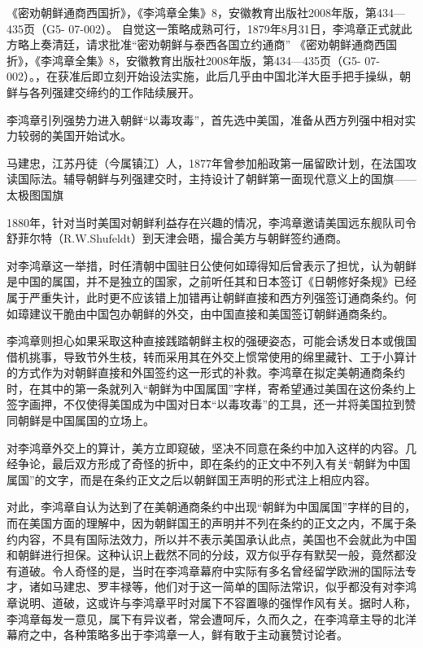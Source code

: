 \documentclass[12pt,UTF8]{ctexbook}
\begin{document}
《密劝朝鲜通商西国折》，《李鸿章全集》8，安徽教育出版社2008年版，第434—435页（G5- 07-002）。
自觉这一策略成熟可行，1879年8月31日，李鸿章正式就此方略上奏清廷，请求批准“密劝朝鲜与泰西各国立约通商” 《密劝朝鲜通商西国折》，《李鸿章全集》8，安徽教育出版社2008年版，第434—435页（G5- 07-002）。，在获准后即立刻开始设法实施，此后几乎由中国北洋大臣手把手操纵，朝鲜与各列强建交缔约的工作陆续展开。

李鸿章引列强势力进入朝鲜“以毒攻毒”，首先选中美国，准备从西方列强中相对实力较弱的美国开始试水。


马建忠，江苏丹徒（今属镇江）人，1877年曾参加船政第一届留欧计划，在法国攻读国际法。辅导朝鲜与列强建交时，主持设计了朝鲜第一面现代意义上的国旗——太极图国旗

1880年，针对当时美国对朝鲜利益存在兴趣的情况，李鸿章邀请美国远东舰队司令舒菲尔特（R.W.Shufeldt）到天津会晤，撮合美方与朝鲜签约通商。

对李鸿章这一举措，时任清朝中国驻日公使何如璋得知后曾表示了担忧，认为朝鲜是中国的属国，并不是独立的国家，之前听任其和日本签订《日朝修好条规》已经属于严重失计，此时更不应该错上加错再让朝鲜直接和西方列强签订通商条约。何如璋建议干脆由中国包办朝鲜的外交，由中国直接和美国签订朝鲜通商条约。

李鸿章则担心如果采取这种直接践踏朝鲜主权的强硬姿态，可能会诱发日本或俄国借机挑事，导致节外生枝，转而采用其在外交上惯常使用的绵里藏针、工于小算计的方式作为对朝鲜直接和外国签约这一形式的补救。李鸿章在拟定美朝通商条约时，在其中的第一条就列入“朝鲜为中国属国”字样，寄希望通过美国在这份条约上签字画押，不仅使得美国成为中国对日本“以毒攻毒”的工具，还一并将美国拉到赞同朝鲜是中国属国的立场上。

对李鸿章外交上的算计，美方立即窥破，坚决不同意在条约中加入这样的内容。几经争论，最后双方形成了奇怪的折中，即在条约的正文中不列入有关“朝鲜为中国属国”的文字，而是在条约正文之后以朝鲜国王声明的形式注上相应内容。

对此，李鸿章自认为达到了在美朝通商条约中出现“朝鲜为中国属国”字样的目的，而在美国方面的理解中，因为朝鲜国王的声明并不列在条约的正文之内，不属于条约内容，不具有国际法效力，所以并不表示美国承认此点，美国也不会就此为中国和朝鲜进行担保。这种认识上截然不同的分歧，双方似乎存有默契一般，竟然都没有道破。令人奇怪的是，当时在李鸿章幕府中实际有多名曾经留学欧洲的国际法专才，诸如马建忠、罗丰禄等，他们对于这一简单的国际法常识，似乎都没有对李鸿章说明、道破，这或许与李鸿章平时对属下不容置喙的强悍作风有关。据时人称，李鸿章每发一意见，属下有异议者，常会遭呵斥，久而久之，在李鸿章主导的北洋幕府之中，各种策略多出于李鸿章一人，鲜有敢于主动襄赞讨论者。
\end{document}
